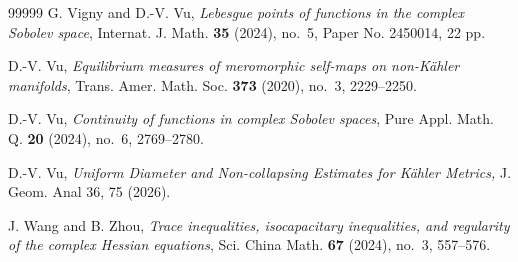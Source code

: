 \documentclass{amsart}
\theoremstyle{definition}
\numberwithin{thm}{section}
\numberwithin{equation}{section}
\renewcommand{\[}{\begin{equation}}
\renewcommand{\]}{\end{equation}}
\begin{document}
\begin{thebibliography}{99999}
G. Vigny and D.-V. Vu, {\it Lebesgue points of functions in the complex Sobolev space}, Internat. J. Math. {\bf 35} (2024), no.~5, Paper No. 2450014, 22 pp.


D.-V. Vu, {\it Equilibrium measures of meromorphic self-maps on non-K\"ahler manifolds}, Trans. Amer. Math. Soc. {\bf 373} (2020), no.~3, 2229--2250.

D.-V. Vu, {\it Continuity of functions in complex Sobolev spaces}, Pure Appl. Math. Q. {\bf 20} (2024), no.~6, 2769--2780.

 D.-V. Vu, {\it Uniform Diameter and Non-collapsing Estimates for Kähler Metrics,} J. Geom. Anal 36, 75 (2026). 

J. Wang and B. Zhou, {\it Trace inequalities, isocapacitary inequalities, and regularity of the complex Hessian equations}, Sci. China Math. {\bf 67} (2024), no.~3, 557--576.

\end{thebibliography}
\end{document}

